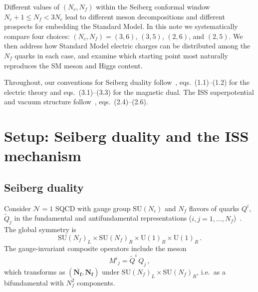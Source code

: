 \documentclass[11pt,a4paper]{article}
\newcommand{\Nf}{N_{\!f}}
\newcommand{\Nc}{N_{\!c}}
\newcommand{\rep}[1]{\mathbf{#1}}
\newcommand{\conjrep}[1]{\overline{\mathbf{#1}}}
\begin{document}
Different values of $(\Nc, \Nf)$ within the Seiberg conformal
window $\Nc + 1 \le \Nf < 3\Nc$ lead to different meson
decompositions and different prospects for embedding the Standard
Model.  In this note we systematically compare four choices:
$(\Nc,\Nf) = (3,6)$, $(3,5)$, $(2,6)$, and $(2,5)$.
We then address how Standard Model electric charges can be
distributed among the $\Nf$ quarks in each case, and examine which
starting point most naturally reproduces the SM meson and Higgs
content.

Throughout, our conventions for Seiberg duality follow~\cite{Seiberg1995},
eqs.~(1.1)--(1.2) for the electric theory and eqs.~(3.1)--(3.3) for the
magnetic dual.  The ISS superpotential and vacuum structure
follow~\cite{ISS2006}, eqs.~(2.4)--(2.6).

\section{Setup: Seiberg duality and the ISS mechanism}
\label{sec:setup}

\subsection{Seiberg duality}

Consider $\mathcal{N}=1$ SQCD with gauge group $\mathrm{SU}(\Nc)$
and $\Nf$ flavors of quarks $Q^i$, $\tilde Q_j$ in the fundamental
and antifundamental representations
($i,j = 1,\ldots,\Nf$)~\cite{Seiberg1995}.
The global symmetry is
\begin{equation}
  \mathrm{SU}(\Nf)_L \times \mathrm{SU}(\Nf)_R
  \times \mathrm{U}(1)_B \times \mathrm{U}(1)_R\,.
  \label{eq:global-sym}
\end{equation}
The gauge-invariant composite operators include the meson
\begin{equation}
  M^i{}_j = \tilde Q^i \, Q_j\,,
  \label{eq:meson-def}
\end{equation}
which transforms as $(\conjrep{\Nf}, \rep{\Nf})$ under
$\mathrm{SU}(\Nf)_L \times \mathrm{SU}(\Nf)_R$, i.e.\ as a
bifundamental with $\Nf^2$ components.
\end{document}
